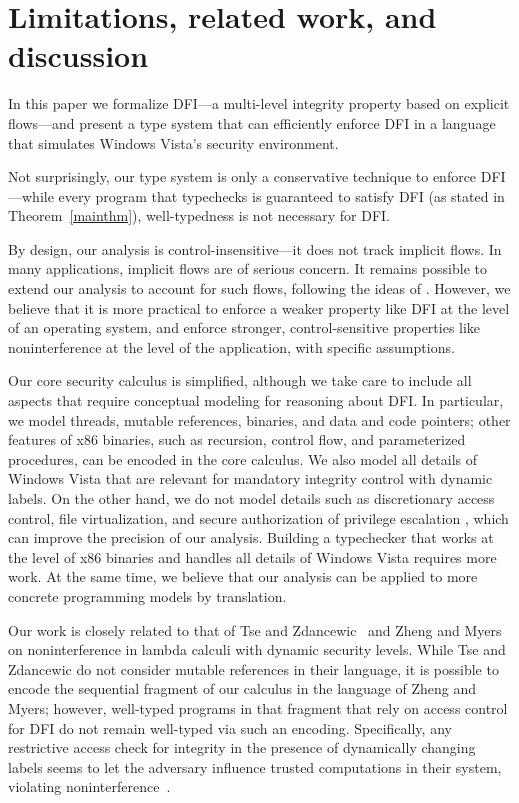 \documentclass{sigplanconf}
\begin{document}
\section{Limitations, related work, and discussion}\label{concl}


In this paper we formalize DFI---a multi-level integrity property based on explicit flows---and present a type system that can efficiently enforce DFI in a language that simulates Windows Vista's security environment. 

Not surprisingly, our type system is only a conservative technique to enforce
DFI---while every program that typechecks is guaranteed to
satisfy DFI (as stated in Theorem~\ref{mainthm}), 
well-typedness is not necessary for DFI. 


By design, our analysis is control-insensitive---it does not track implicit flows. In many applications, implicit flows are of serious concern. It remains possible to extend our analysis to account for such flows, following the ideas of \cite{vis,robustdeclass,myers04enforcing,lipopl}. However, we believe that it is more practical to enforce a weaker property like DFI at the level of an operating system, and enforce stronger, control-sensitive properties like noninterference at the level of the application, with specific assumptions. 

Our core security calculus is simplified,
although we take care to include all aspects that require conceptual modeling 
for reasoning
about DFI.
In particular, we model threads, mutable references, binaries, and data and code pointers; other features of x86 binaries, 
such as recursion, control flow, and parameterized procedures, can be encoded in the core calculus.
We also model all details of Windows Vista that are relevant for mandatory integrity control with dynamic labels. On the other hand, we do not model details 
such as discretionary access control, file virtualization, and secure authorization of privilege escalation \cite{bppvista}, which can improve the precision of our analysis.
Building a typechecker that works at the level of x86 binaries and handles
all details of Windows Vista requires more work. At the same time, we believe that our analysis can be applied to more concrete programming models by translation. 

Our work is closely related to that of Tse and
Zdancewic~\cite{runtimeprin} and Zheng and Myers \cite{dynseclab} on
noninterference in lambda calculi with dynamic security levels. While Tse and Zdancewic do not consider mutable references in their language, it is possible to encode the sequential fragment of our calculus in the language of Zheng and Myers; however, well-typed programs in that fragment that rely on access control for DFI do not remain well-typed via such an encoding. Specifically, any restrictive access check for integrity in the presence of dynamically changing labels seems to let the adversary influence trusted computations in their system, violating noninterference~\cite{zheng}. 
\end{document}
